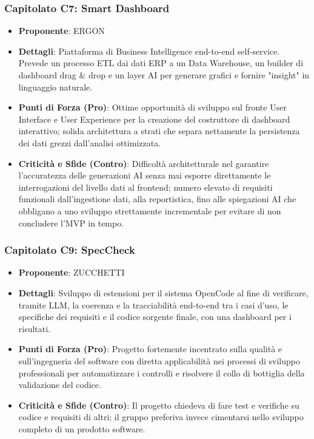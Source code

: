 \subsubsection{Capitolato C7: Smart Dashboard}
\begin{itemize}
    \item \textbf{Proponente}: ERGON
    \item \textbf{Dettagli}: Piattaforma di Business Intelligence end-to-end self-service. Prevede un processo ETL dai dati ERP a un Data Warehouse, un builder di dashboard drag \& drop e un layer AI per generare grafici e fornire "insight" in linguaggio naturale.

    \item \textbf{Punti di Forza (Pro)}: Ottime opportunità di sviluppo sul fronte User Interface e User Experience per la creazione del costruttore di dashboard interattivo; solida architettura a strati che separa nettamente la persistenza dei dati grezzi dall'analisi ottimizzata.

    \item \textbf{Criticità e Sfide (Contro)}: Difficoltà architetturale nel garantire l'accuratezza delle generazioni AI senza mai esporre direttamente le interrogazioni del livello dati al frontend; numero elevato di requisiti funzionali dall'ingestione dati, alla reportistica, fino alle spiegazioni AI che obbligano a uno sviluppo strettamente incrementale per evitare di non concludere l'MVP in tempo.

\end{itemize}

\subsubsection{Capitolato C9: SpecCheck}
\begin{itemize}
    \item \textbf{Proponente}: ZUCCHETTI
    \item \textbf{Dettagli}: Sviluppo di estensioni per il sistema OpenCode al fine di verificare, tramite LLM, la coerenza e la tracciabilità end-to-end tra i casi d'uso, le specifiche dei requisiti e il codice sorgente finale, con una dashboard per i risultati.

    \item \textbf{Punti di Forza (Pro)}: Progetto fortemente incentrato sulla qualità e sull'ingegneria del software con diretta applicabilità nei processi di sviluppo professionali per automatizzare i controlli e risolvere il collo di bottiglia della validazione del codice.

    \item \textbf{Criticità e Sfide (Contro)}: Il progetto chiedeva di fare test e verifiche su codice e requisiti di altri; il gruppo preferiva invece cimentarsi nello sviluppo completo di un prodotto software. 

\end{itemize}

